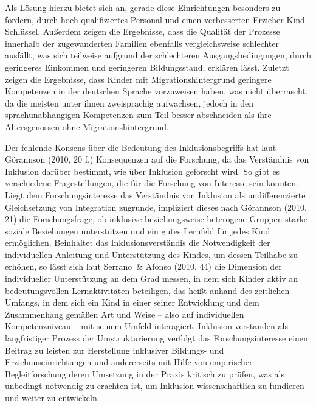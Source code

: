 Als Lösung hierzu bietet sich an, gerade diese Einrichtungen besonders zu fördern, durch hoch qualifiziertes Personal und einen verbesserten
Erzieher-Kind-Schlüssel. Außerdem zeigen die Ergebnisse, dass die Qualität der Prozesse innerhalb der zugewanderten Familien ebenfalls vergleichsweise schlechter ausfällt, was sich teilweise aufgrund der schlechteren Ausgangsbedingungen, durch geringeres Einkommen und geringeren Bildungsstand, erklären lässt. 
Zuletzt zeigen die Ergebnisse, dass Kinder mit Migrationshintergrund geringere Kompetenzen in der deutschen Sprache vorzuweisen haben, was nicht überrascht, da die meisten unter ihnen zweisprachig aufwachsen, jedoch in den sprachunabhängigen Kompetenzen zum Teil besser abschneiden als ihre Altersgenossen ohne Migrationshintergrund.
  
Der fehlende Konsens über die Bedeutung des Inklusionsbegriffs hat laut Görannson (2010, 20 f.) Konsequenzen auf die Forschung, da das Verständnis von Inklusion darüber bestimmt, wie über Inklusion geforscht wird. So gibt es verschiedene Fragestellungen, die für die Forschung von Interesse sein könnten. Liegt dem Forschungsinteresse das Verständnis von Inklusion als undifferenzierte Gleichsetzung von Integration zugrunde, impliziert dieses nach Görannson (2010, 21) die Forschungsfrage, ob inklusive beziehungsweise heterogene Gruppen starke soziale Beziehungen unterstützen und ein gutes Lernfeld für jedes Kind ermöglichen. Beinhaltet das Inklusionsverständis die Notwendigkeit der individuellen Anleitung und Unterstützung des Kindes, um dessen Teilhabe zu erhöhen, so lässt sich laut Serrano~\& Afonso (2010, 44) die Dimension der individueller Unterstützung an dem Grad messen, in dem sich Kinder aktiv an bedeutungsvollen Lernaktivitäten beteiligen, das heißt anhand des zeitlichen Umfangs, in dem sich ein Kind in einer seiner Entwicklung und dem Zusammenhang gemäßen Art und Weise -- also auf individuellen Kompetenzniveau -- mit seinem Umfeld interagiert.
Inklusion verstanden als langfristiger Prozess der Umstrukturierung verfolgt das Forschungsinteresse einen Beitrag zu leisten zur Herstellung inklusiver Bildungs- und Erziehunseinrichtungen und  andererseits mit Hilfe von empirischer Begleitforschung deren Umsetzung in der Praxis kritisch zu prüfen, was als unbedingt notwendig zu erachten ist, um Inklusion wissenschaftlich zu fundieren und weiter zu entwickeln.

